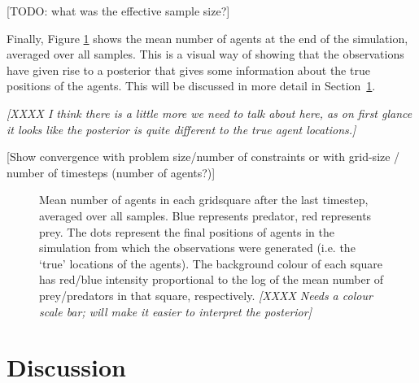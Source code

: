 \documentclass{article}
\begin{document}
[TODO: what was the effective sample size?]

Finally, Figure \ref{figEndState} shows the mean number of agents at the end of the simulation, averaged over all samples. This is a visual way of showing that the observations have given rise to a posterior that gives some information about the true positions of the agents. This will be discussed in more detail in Section~\ref{discussion}.

\textit{[XXXX I think there is a little more we need to talk about here, as on first glance it looks like the posterior is quite different to the true agent locations.]}

[Show convergence with problem size/number of constraints or with grid-size / number of timesteps (number of agents?)]

\begin{figure}[ht]
	\centering
	\caption{Mean number of agents in each gridsquare after the last timestep, averaged over all samples. Blue represents predator, red represents prey. The dots represent the final positions of agents in the simulation from which the observations were generated (i.e. the `true' locations of the agents). The background colour of each square has red/blue intensity proportional to the log of the mean number of prey/predators in that square, respectively. \textit{[XXXX Needs a colour scale bar; will make it easier to interpret the posterior]}}
	\label{figEndState}
\end{figure}


\section{Discussion} 
\label{discussion}
\end{document}
